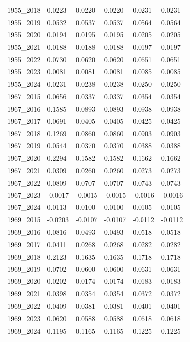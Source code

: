 \begin{table}[htbp]
\begin{tabular}{llllll}
1955_2018 & 0.0223 & 0.0220 & 0.0220 & 0.0231 & 0.0231 \\
1955_2019 & 0.0532 & 0.0537 & 0.0537 & 0.0564 & 0.0564 \\
1955_2020 & 0.0194 & 0.0195 & 0.0195 & 0.0205 & 0.0205 \\
1955_2021 & 0.0188 & 0.0188 & 0.0188 & 0.0197 & 0.0197 \\
1955_2022 & 0.0730 & 0.0620 & 0.0620 & 0.0651 & 0.0651 \\
1955_2023 & 0.0081 & 0.0081 & 0.0081 & 0.0085 & 0.0085 \\
1955_2024 & 0.0231 & 0.0238 & 0.0238 & 0.0250 & 0.0250 \\
1967_2015 & 0.0656 & 0.0337 & 0.0337 & 0.0354 & 0.0354 \\
1967_2016 & 0.1585 & 0.0893 & 0.0893 & 0.0938 & 0.0938 \\
1967_2017 & 0.0691 & 0.0405 & 0.0405 & 0.0425 & 0.0425 \\
1967_2018 & 0.1269 & 0.0860 & 0.0860 & 0.0903 & 0.0903 \\
1967_2019 & 0.0544 & 0.0370 & 0.0370 & 0.0388 & 0.0388 \\
1967_2020 & 0.2294 & 0.1582 & 0.1582 & 0.1662 & 0.1662 \\
1967_2021 & 0.0309 & 0.0260 & 0.0260 & 0.0273 & 0.0273 \\
1967_2022 & 0.0809 & 0.0707 & 0.0707 & 0.0743 & 0.0743 \\
1967_2023 & -0.0017 & -0.0015 & -0.0015 & -0.0016 & -0.0016 \\
1967_2024 & 0.0113 & 0.0100 & 0.0100 & 0.0105 & 0.0105 \\
1969_2015 & -0.0203 & -0.0107 & -0.0107 & -0.0112 & -0.0112 \\
1969_2016 & 0.0816 & 0.0493 & 0.0493 & 0.0518 & 0.0518 \\
1969_2017 & 0.0411 & 0.0268 & 0.0268 & 0.0282 & 0.0282 \\
1969_2018 & 0.2123 & 0.1635 & 0.1635 & 0.1718 & 0.1718 \\
1969_2019 & 0.0702 & 0.0600 & 0.0600 & 0.0631 & 0.0631 \\
1969_2020 & 0.0202 & 0.0174 & 0.0174 & 0.0183 & 0.0183 \\
1969_2021 & 0.0398 & 0.0354 & 0.0354 & 0.0372 & 0.0372 \\
1969_2022 & 0.0409 & 0.0381 & 0.0381 & 0.0401 & 0.0401 \\
1969_2023 & 0.0620 & 0.0588 & 0.0588 & 0.0618 & 0.0618 \\
1969_2024 & 0.1195 & 0.1165 & 0.1165 & 0.1225 & 0.1225 \\

\end{tabular}
\end{table}

